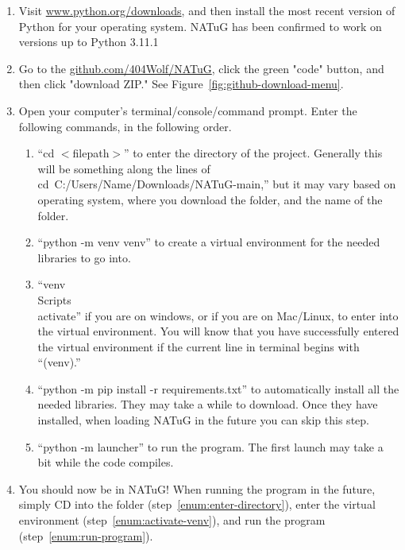 \documentclass[titlepage]{article}
\begin{document}
	\begin{enumerate}
		\item Visit \href{Python's download page}{www.python.org/downloads}, and then install the most recent version of Python for your operating system. NATuG has been confirmed to work on versions up to Python 3.11.1
		\item Go to the \href{NATuG’s Github page}{github.com/404Wolf/NATuG}, click the green "code" button, and then click "download ZIP." See Figure~\ref{fig:github-download-menu}.
		\item Open your computer’s terminal/console/command prompt. Enter the following commands, in the following order. 
		
		\begin{enumerate}
			\item “cd $<$filepath$>$” to enter the directory of the project. Generally this will be something along the lines of \mbox{cd C:/Users/Name/Downloads/NATuG-main,”} but it may vary based on operating system, where you download the folder, and the name of the folder. \label{enum:enter-directory}
			\item “python -m venv venv” to create a virtual environment for the needed libraries to go into.
			\item “venv\\Scripts\\activate” if you are on windows, or 	if you are on Mac/Linux, to enter into the virtual environment. You will know that you have successfully entered the virtual environment if the current line in terminal begins with “(venv).” \label{enum:activate-venv}
			\item “python -m pip install -r requirements.txt” to automatically install all the needed libraries. They may take a while to download. Once they have installed, when	loading NATuG in the future you can skip this step.
			\item “python -m launcher” to run the program. The first launch may take a bit while the code compiles. \label{enum:run-program}
		\end{enumerate}
	
		\item You should now be in NATuG! When running the program in the future, simply CD into the folder (step~\ref{enum:enter-directory}), enter the virtual environment (step~\ref{enum:activate-venv}), and run the program (step~\ref{enum:run-program}).
	\end{enumerate}
\end{document}
